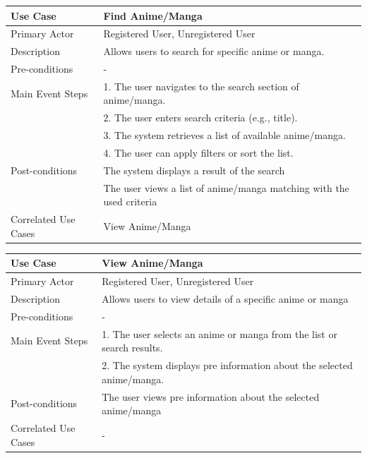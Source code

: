 \begin{longtable}{|p{}|p{}|}
    \hline
    \rowcolor{lightblue}
    \textbf{Use Case} & \textbf{Find Anime/Manga} \\
    \hline
    Primary Actor & Registered User, Unregistered User\\
    \hline
    Description & Allows users to search for specific anime or manga. \\
    \hline
    Pre-conditions & - \\
    \hline
    Main Event Steps &  1. The user navigates to the search section of anime/manga. \\
    & 2. The user enters search criteria (e.g., title). \\
    & 3. The system retrieves a list of available anime/manga. \\
    & 4. The user can apply filters or sort the list. \\
    \hline
    Post-conditions & The system displays a result of the search \\
    & The user views a list of anime/manga matching with the used criteria\\
    \hline
    Correlated Use Cases &View Anime/Manga \\
    \hline
\end{longtable}

\begin{longtable}{|p{}|p{}|}
    \hline
    \rowcolor{lightblue}
    \textbf{Use Case} & \textbf{View Anime/Manga} \\
    \hline
    Primary Actor & Registered User, Unregistered User\\
    \hline
    Description &Allows users to view details of a specific anime or manga \\
    \hline
    Pre-conditions & -\\
    \hline
    Main Event Steps & 1. The user selects an anime or manga from the list or search results.\\
    & 2. The system displays pre information about the selected anime/manga. \\
    \hline
    Post-conditions & The user views pre information about the selected anime/manga\\
    \hline
    Correlated Use Cases & -\\
    \hline
\end{longtable}

\newpage

